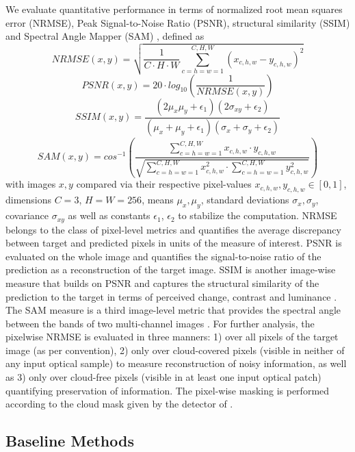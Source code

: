 \documentclass[journal]{IEEEtran}
\begin{document}
We evaluate quantitative performance in terms of normalized root mean squares error (NRMSE), Peak Signal-to-Noise Ratio (PSNR), structural similarity (SSIM) \cite{Wang_Bovik_Sheikh_Simoncelli_2004} and Spectral Angle Mapper (SAM) \cite{kruse1993spectral}, defined as
$$NRMSE(x,y) = \sqrt{\frac{1}{C \cdot H \cdot W} \sum_{c=h=w=1}^{C, H, W} (x_{c, h, w}-y_{c, h, w})^2}$$ 
$$PSNR(x,y) = 20 \cdot log_{10} \left( \frac{1}{NRMSE(x,y)} \right)$$ 
$$SSIM(x,y) = \frac{(2 \mu_x\mu_y + \epsilon_1)(2 \sigma_{xy} + \epsilon_2)}{(\mu_x+\mu_y+\epsilon_1)(\sigma_x + \sigma_y + \epsilon_2)}$$
\small $$SAM(x,y) = cos^{-1} \left( \frac{\sum^{C, H, W}_{c=h=w=1} x_{c, h, w} \cdot y_{c, h, w}}{\sqrt{\sum^{C, H, W}_{c=h=w=1} x_{c, h, w}^2 \cdot \sum^{C, H, W}_{c=h=w=1} y_{c, h, w}^2}} \right)$$
\normalsize
with images $x,y$ compared via their respective pixel-values $x_{c, h, w}, y_{c, h, w} \in [0,1]$, dimensions $C=3$, $H=W=256$, means $\mu_x, \mu_y$, standard deviations $\sigma_x, \sigma_y$, covariance  $\sigma_{xy}$ as well as constants  $\epsilon_1$, $\epsilon_2$ to stabilize the computation. NRMSE belongs to the class of pixel-level metrics and quantifies the average discrepancy between target and predicted pixels in units of the measure of interest. PSNR is evaluated on the whole image and quantifies the signal-to-noise ratio of the prediction as a reconstruction of the target image. SSIM is another image-wise measure that builds on PSNR and captures the structural similarity of the prediction to the target in terms of perceived change, contrast and luminance \cite{Wang_Bovik_Sheikh_Simoncelli_2004}. The SAM measure is a third image-level metric that provides the spectral angle between the bands of two multi-channel images \cite{kruse1993spectral}. For further analysis, the pixelwise NRMSE is evaluated in three manners: 1) over all pixels of the target image (as per convention), 2) only over cloud-covered pixels (visible in neither of any input optical sample) to measure reconstruction of noisy information, as well as 3) only over cloud-free pixels (visible in at least one input optical patch) quantifying preservation of information. The pixel-wise masking is performed according to the cloud mask given by the detector of \cite{Zupanc}.

\subsection{Baseline Methods} \label{sub:baselines}
\end{document}
